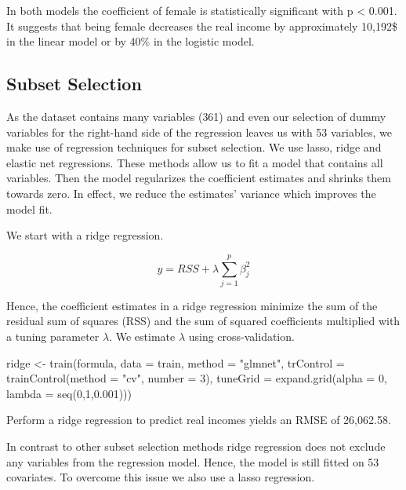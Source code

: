 \documentclass[11pt,a4paper]{article}
\newenvironment{Shaded}{\begin{snugshade}}{\end{snugshade}}
\newcommand{\AttributeTok}[1]{\textcolor[rgb]{0.77,0.63,0.00}{#1}}
\newcommand{\DecValTok}[1]{\textcolor[rgb]{0.00,0.00,0.81}{#1}}
\newcommand{\FloatTok}[1]{\textcolor[rgb]{0.00,0.00,0.81}{#1}}
\newcommand{\FunctionTok}[1]{\textcolor[rgb]{0.00,0.00,0.00}{#1}}
\newcommand{\NormalTok}[1]{#1}
\newcommand{\OtherTok}[1]{\textcolor[rgb]{0.56,0.35,0.01}{#1}}
\newcommand{\StringTok}[1]{\textcolor[rgb]{0.31,0.60,0.02}{#1}}
\begin{document}
In both models the coefficient of female is statistically significant
with p \textless{} 0.001. It suggests that being female decreases the
real income by approximately 10,192\$ in the linear model or by 40\% in
the logistic model.

\hypertarget{subset-selection}{%
\subsection{Subset Selection}\label{subset-selection}}

As the dataset contains many variables (361) and even our selection of
dummy variables for the right-hand side of the regression leaves us with
53 variables, we make use of regression techniques for subset selection.
We use lasso, ridge and elastic net regressions. These methods allow us
to fit a model that contains all variables. Then the model regularizes
the coefficient estimates and shrinks them towards zero. In effect, we
reduce the estimates' variance which improves the model fit.

We start with a ridge regression.

\[
y = RSS + \lambda \sum^p _{j=1} \beta^2_j 
\]

Hence, the coefficient estimates in a ridge regression minimize the sum
of the residual sum of squares (RSS) and the sum of squared coefficients
multiplied with a tuning parameter \(\lambda\). We estimate \(\lambda\)
using cross-validation.

\begin{Shaded}
\begin{Highlighting}[]
\NormalTok{ridge }\OtherTok{\textless{}{-}} \FunctionTok{train}\NormalTok{(formula, }\AttributeTok{data =}\NormalTok{ train,}
  \AttributeTok{method =} \StringTok{"glmnet"}\NormalTok{, }\AttributeTok{trControl =} \FunctionTok{trainControl}\NormalTok{(}\AttributeTok{method =} \StringTok{"cv"}\NormalTok{, }\AttributeTok{number =} \DecValTok{3}\NormalTok{),}
  \AttributeTok{tuneGrid =} \FunctionTok{expand.grid}\NormalTok{(}\AttributeTok{alpha =} \DecValTok{0}\NormalTok{, }\AttributeTok{lambda =} \FunctionTok{seq}\NormalTok{(}\DecValTok{0}\NormalTok{,}\DecValTok{1}\NormalTok{,}\FloatTok{0.001}\NormalTok{)))}
\end{Highlighting}
\end{Shaded}

Perform a ridge regression to predict real incomes yields an RMSE of
26,062.58.

In contrast to other subset selection methods ridge regression does not
exclude any variables from the regression model. Hence, the model is
still fitted on 53 covariates. To overcome this issue we also use a
lasso regression.
\end{document}
